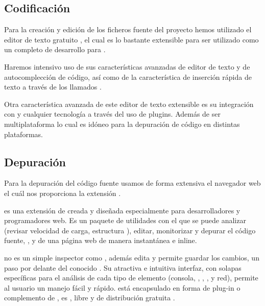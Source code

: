 \subsection{Codificación}
Para la creación y edición de los ficheros fuente del proyecto hemos utilizado
el editor de texto gratuito  \cite{prog:sublimetext2}, el
cual es lo bastante extensible para ser utilizado como un completo 
de desarrollo para .

Haremos intensivo uso de sus características avanzadas de editor de texto y de
autocomplección de código, así como de la característica de inserción rápida de
texto a través de los llamados  \cite{prog:snippets}.

Otra característica avanzada de este editor de texto extensible es su
integración con  y cualquier tecnología a través del uso de
plugins. Además de ser multiplataforma lo cual es idóneo para la depuración de
código  en distintas plataformas.

\subsection{Depuración}
Para la depuración del código fuente usamos de forma extensiva el navegador web
 \cite{prog:firefox} el cuál nos proporciona la extensión
 \cite{prog:firebug}.

 es una extensión de  creada y diseñada
especialmente para desarrolladores y programadores web. Es un paquete de
utilidades con el que se puede analizar (revisar velocidad de carga, estructura
), editar, monitorizar y depurar el código fuente, ,
 y  de una página web de manera instantánea e
inline.


 no es un simple inspector como , además edita y
permite guardar los cambios, un paso por delante del conocido . Su atractiva e intuitiva interfaz, con solapas específicas para el
análisis de cada tipo de elemento (consola, , ,
,  y red), permite al usuario un manejo fácil y
rápido.  está encapsulado en forma de plug-in o complemento de
, es , libre y de distribución gratuita \cite{wiki:firebug}.


